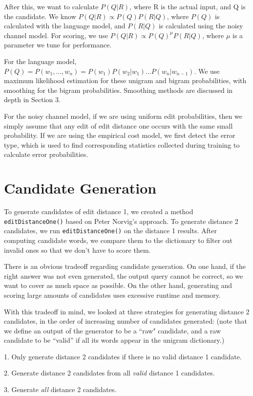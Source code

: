\documentclass[10pt,twocolumn]{article}
\begin{document}
After this, we want to calculate $P(Q|R)$, where R is the actual input, and Q is the candidate. We know $P(Q|R)\propto P(Q)P(R|Q)$, where $P(Q)$ is calculated with the language model, and $P(R|Q)$ is calculated using the noisy channel model. For scoring, we use $P(Q|R)\propto P(Q)^\mu P(R|Q)$, where $\mu$ is a parameter we tune for performance.

For the language model, $P(Q)=P(w_1,\dots,w_n)=P(w_1)P(w_2|w_1)\dots P(w_n|w_{n-1})$. We use maximum likelihood estimation for these unigram and bigram probabilities, with smoothing for the bigram probabilities. Smoothing methods are discussed in depth in Section 3.

For the noisy channel model, if we are using uniform edit probabilities, then we simply assume that any edit of edit distance one occurs with the same small probability. If we are using the empirical cost model, we first detect the error type, which is used to find corresponding statistics collected during training to calculate error probabilities.
\section{Candidate Generation}
To generate candidates of edit distance 1, we created a method \texttt{editDistanceOne()} based on Peter Norvig's approach. To generate distance 2 candidates, we run \texttt{editDistanceOne()} on the distance 1 results. After computing candidate words, we compare them to the dictionary to filter out invalid ones so that we don't have to score them.
 
There is an obvious tradeoff regarding candidate generation. On one hand, if the right answer was not even generated, the output query cannot be correct, so we want to cover as much space as possible. On the other hand, generating and scoring large amounts of candidates uses excessive runtime and memory.

With this tradeoff in mind, we looked at three strategies for generating distance 2 candidates, in the order of increasing number of candidates generated: (note that we define an output of the generator to be a ``raw" candidate, and a raw candidate to be ``valid'' if all its words appear in the unigram dictionary.)

1. Only generate distance 2 candidates if there is no valid distance 1 candidate.

2. Generate distance 2 candidates from all {\it valid} distance 1 candidates.

3. Generate {\it all} distance 2 candidates.
\end{document}
